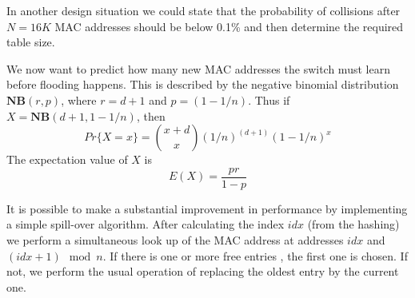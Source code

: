 In another design situation we could state that the probability of collisions after $N=16K$ MAC addresses
should be below 0.1\% and then determine the required table size.

We now want to predict how many new MAC addresses the switch must learn before flooding happens. This is
described by the negative binomial distribution $\mathbf{NB}(r,p)$, where $r=d+1$ and $p=(1-1/n)$. Thus
if $X = \mathbf{NB}(d+1, 1-1/n)$, then
$$
   Pr\{X=x\}  = \binom{x+d}{x}(1/n)^{(d+1)}(1-1/n)^x
$$
The expectation value of $X$ is 
$$
   E(X) = \frac{pr}{1-p}
$$

It is possible to make a substantial improvement in performance by implementing 
a simple spill-over algorithm. After calculating the index $idx$ (from the hashing) we 
perform a simultaneous look up of the MAC address at addresses $idx$ and $(idx+1) \mod n$.
If there is one or more free entries , the first one is chosen. If not, we perform the usual 
operation of replacing the oldest entry by the current one.


